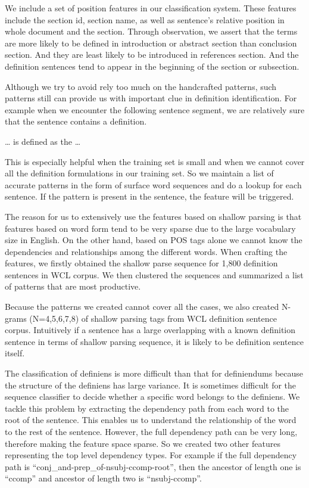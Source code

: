 \documentclass[hyp]{socreport}
\begin{document}
We include a set of position features in our classification system. These features include the section id, section name, as well as sentence’s relative position in whole document and the section. Through observation, we assert that the terms are more likely to be defined in introduction or abstract section than conclusion section. And they are least likely to be introduced in references section. And the definition sentences tend to appear in the beginning of the section or subsection. 

Although we try to avoid rely too much on the handcrafted patterns, such patterns still can provide us with important clue in definition identification. For example when we encounter the following sentence segment, we are relatively sure that the sentence contains a definition.

\begin{center}
… is defined as the …
\end{center}

This is especially helpful when the training set is small and when we cannot cover all the definition formulations in our training set. So we maintain a list of accurate patterns in the form of surface word sequences and do a lookup for each sentence. If the pattern is present in the sentence, the feature will be triggered.

The reason for us to extensively use the features based on shallow parsing is that features based on word form tend to be very sparse due to the large vocabulary size in English. On the other hand, based on POS tags alone we cannot know the dependencies and relationships among the different words. When crafting the features, we firstly obtained the shallow parse sequence for 1,800 definition sentences in WCL corpus. We then clustered the sequences and summarized a list of patterns that are most productive. 

Because the patterns we created cannot cover all the cases, we also created N-grams (N=4,5,6,7,8) of shallow parsing tags from WCL definition sentence corpus. Intuitively if a sentence has a large overlapping with a known definition sentence in terms of shallow parsing sequence, it is likely to be definition sentence itself. 

The classification of definiens is more difficult than that for definiendums because the structure of the definiens has large variance. It is sometimes difficult for the sequence classifier to decide whether a specific word belongs to the definiens. We tackle this problem by extracting the dependency path from each word to the root of the sentence. This enables us to understand the relationship of the word to the rest of the sentence. However, the full dependency path can be very long, therefore making the feature space sparse. So we created two other features representing the top level dependency types. For example if the full dependency path is ``conj\_and-prep\_of-nsubj-ccomp-root'', then the ancestor of length one is ``ccomp'' and ancestor of length two is ``nsubj-ccomp''. 
\end{document}
